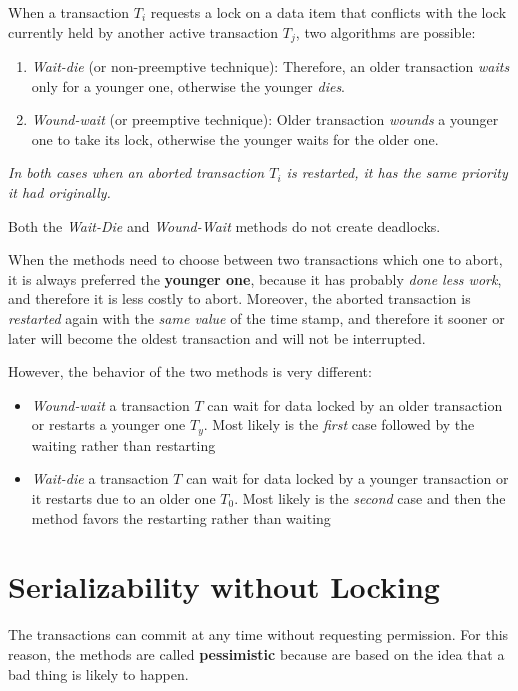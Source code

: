 When a transaction $T_i$ requests a lock on a data item that conflicts with the lock currently held by another active transaction $T_j$, two algorithms are possible:
\begin{enumerate}
    \item \textit{Wait-die} (or non-preemptive technique):
    Therefore, an older transaction \textit{waits} only for a younger one, otherwise the younger \textit{dies}.
    \item \textit{Wound-wait} (or preemptive technique):
    Older transaction \textit{wounds} a younger one to take its lock, otherwise the younger waits for the older one.
\end{enumerate}

\textit{In both cases when an aborted transaction $T_i$ is restarted, it has the same priority it had originally.}

\begin{tcolorbox}
Both the \textit{Wait-Die} and \textit{Wound-Wait} methods do not create deadlocks.
\end{tcolorbox}

When the methods need to choose between two transactions which one to abort, it is always preferred the \textbf{younger one}, because it has probably \textit{done less work}, and therefore it is less costly to abort. Moreover, the aborted transaction is \textit{restarted} again with the \textit{same value} of the time stamp, and therefore it sooner or later will become the oldest transaction and will not be interrupted.

However, the behavior of the two methods is very different:
\begin{itemize}
    \item \textit{Wound-wait} a transaction $T$ can wait for data locked by an older transaction or restarts a younger one $T_y$. Most likely is the \textit{first} case followed by the waiting rather than restarting
    \item \textit{Wait-die} a transaction $T$ can wait for data locked by a younger transaction or it restarts due to an older one $T_0$. Most likely is the \textit{second} case and then the method favors the restarting rather than waiting
\end{itemize}

\section{Serializability without Locking}
The transactions can commit at any time without requesting permission. For this reason, the methods are called \textbf{pessimistic} because are based on the idea that a bad thing is likely to happen.

